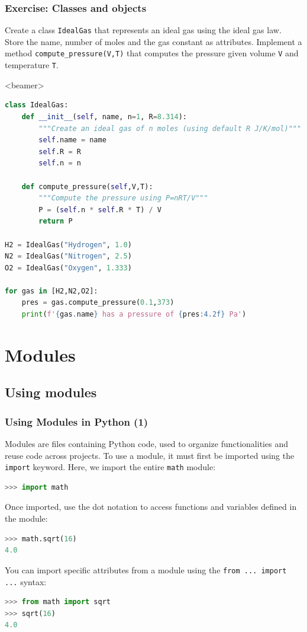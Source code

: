 \begin{frame}[fragile]
  \frametitle{Exercise: Classes and objects}
  Create a class \lstinline|IdealGas| that represents an ideal gas using the ideal gas law. Store the name, number of moles and the gas constant as attributes. Implement a method \lstinline|compute_pressure(V,T)| that computes the pressure given volume \lstinline|V| and temperature \lstinline|T|.
    \pause
    \begin{onlyenv}<beamer>
      \begin{lstlisting}[language=Python]
class IdealGas:
    def __init__(self, name, n=1, R=8.314):
        """Create an ideal gas of n moles (using default R J/K/mol)"""
        self.name = name
        self.R = R
        self.n = n
        
    def compute_pressure(self,V,T):
        """Compute the pressure using P=nRT/V"""
        P = (self.n * self.R * T) / V
        return P

H2 = IdealGas("Hydrogen", 1.0)
N2 = IdealGas("Nitrogen", 2.5)
O2 = IdealGas("Oxygen", 1.333)

for gas in [H2,N2,O2]:
    pres = gas.compute_pressure(0.1,373)
    print(f'{gas.name} has a pressure of {pres:4.2f} Pa')
      \end{lstlisting}

  \end{onlyenv}
 \end{frame}

\section{Modules}
\subsection{Using modules}
\begin{frame}[fragile]
  \frametitle{Using Modules in Python (1)}
  Modules are files containing Python code, used to organize functionalities and reuse code across projects. To use a module, it must first be imported using the \lstinline{import} keyword. Here, we import the entire \lstinline{math} module:
  \begin{lstlisting}[language=Python, numbers=none]
>>> import math
  \end{lstlisting}\pause
  Once imported, use the dot notation to access functions and variables defined in the module:
  \begin{lstlisting}[language=Python, numbers=none]
>>> math.sqrt(16)
4.0
  \end{lstlisting}\pause
  You can import specific attributes from a module using the \lstinline{from ... import ...} syntax:
  \begin{lstlisting}[language=Python, numbers=none]
>>> from math import sqrt
>>> sqrt(16)
4.0
  \end{lstlisting}
\end{frame}

